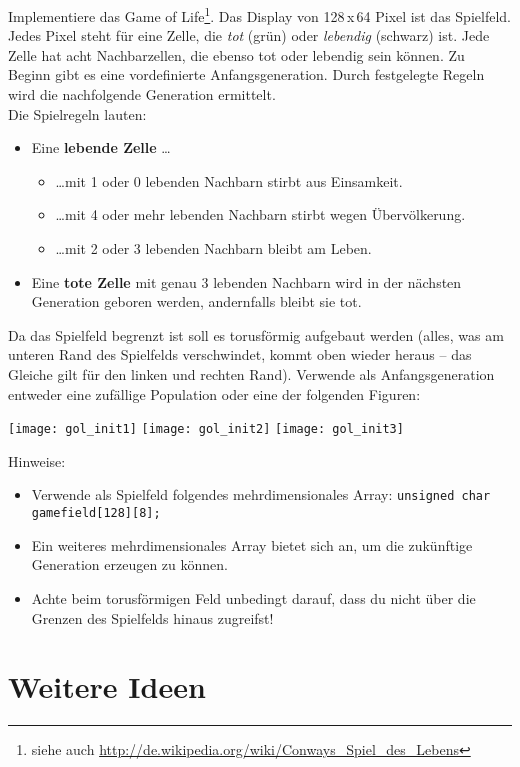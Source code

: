 \documentclass[
  accentcolor=tud1c,	%
  colorbacktitle,		%
  inverttitle,			%
  german,				%
  twoside
]{tudexercise}
\begin{document}
Implementiere das \glqq{}Game of Life\grqq{}\footnote{siehe auch \url{http://de.wikipedia.org/wiki/Conways_Spiel_des_Lebens}}.
Das Display von 128\,x\,64 Pixel ist das Spielfeld.
Jedes Pixel steht für eine Zelle, die \textit{tot} (grün) oder \textit{lebendig} (schwarz) ist.
Jede Zelle hat acht Nachbarzellen, die ebenso tot oder lebendig sein können.
Zu Beginn gibt es eine vordefinierte Anfangsgeneration.
Durch festgelegte Regeln wird die nachfolgende Generation ermittelt.\\
Die Spielregeln lauten:
\begin{itemize}
\item Eine \textbf{lebende Zelle} \dots
\begin{itemize}
\item \dots mit 1 oder 0 lebenden Nachbarn stirbt aus Einsamkeit.
\item \dots mit 4 oder mehr lebenden Nachbarn stirbt wegen Übervölkerung.
\item \dots mit 2 oder 3 lebenden Nachbarn bleibt am Leben.
\end{itemize}
\item Eine \textbf{tote Zelle} mit genau 3 lebenden Nachbarn wird in der nächsten Generation geboren werden, andernfalls bleibt sie tot.
\end{itemize}
Da das Spielfeld begrenzt ist soll es torusförmig aufgebaut werden (alles, was am unteren Rand des Spielfelds verschwindet, kommt oben wieder heraus -- das Gleiche gilt für den linken und rechten Rand). 
Verwende als Anfangsgeneration entweder eine zufällige Population oder eine der folgenden Figuren:
\begin{center}
\texttt{[image: gol\_init1]}
\hspace{5mm}
\texttt{[image: gol\_init2]}
\hspace{5mm}
\texttt{[image: gol\_init3]}
\end{center}
Hinweise:
\begin{itemize}
\item Verwende als Spielfeld folgendes mehrdimensionales Array:
\texttt{unsigned char gamefield[128][8];}
\item Ein weiteres mehrdimensionales Array bietet sich an, um die zukünftige Generation erzeugen zu können.
\item Achte beim torusförmigen Feld unbedingt darauf, dass du nicht über die Grenzen des Spielfelds hinaus zugreifst!
\end{itemize}

\section{Weitere Ideen}
\end{document}
